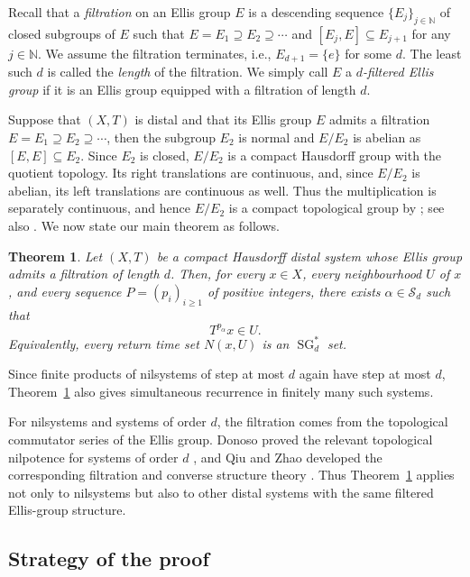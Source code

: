 \documentclass[11pt]{amsart}
\newtheorem{theorem}{Theorem}[section]
\theoremstyle{definition}
\theoremstyle{remark}
\DeclareMathOperator{\SG}{SG}
\newcommand{\Sd}{\mathcal S_d}
\begin{document}
Recall that a \emph{filtration} on an Ellis group $E$ is a descending sequence $\{E_j\}_{j \in \mathbb{N}}$ of closed subgroups of $E$ such that $E = E_1 \supseteq E_2 \supseteq \cdots$ and  $[E_j, E] \subseteq E_{j+1}$ for any $j \in \mathbb{N}$. 
 We assume the filtration terminates, i.e., $E_{d+1} = \{e\}$ for some $d$.
  The least such $d$ is called the \emph{length} of the filtration. We simply call $E$ a \emph{$d$-filtered Ellis group} if it is an Ellis group equipped with a filtration of length $d$.

Suppose that $(X,T)$ is distal and that its Ellis group $E$ admits a filtration $E=E_1 \supseteq E_2 \supseteq \cdots$, then the subgroup $E_2$ is normal and $E/E_2$ is abelian as $[E, E] \subseteq E_2$.  
Since $E_2$ is closed, $E/E_2$ is a compact Hausdorff group with the quotient topology. Its right translations are continuous, and, since $E/E_2$ is abelian, its left translations are continuous as well. Thus the multiplication is separately continuous, and hence $E/E_2$ is a compact topological group by \cite[Corollary~4.3]{QiuZhao2022}; see also \cite[Appendix~B, Corollary~B.18]{de Vries}.
We now state our main theorem as follows.

\begin{theorem}\label{thm:dynamical}
Let $(X,T)$ be a compact Hausdorff distal system whose Ellis group admits a
filtration of length $d$.  Then, for every $x\in X$, every
neighbourhood $U$ of $x$, and every sequence $P=(p_i)_{i\geq1}$ of positive
integers, there exists $\alpha\in\Sd$ such that
\[
 T^{p_\alpha}x\in U.
\]
Equivalently, every return time set $N(x,U)$ is an $\SG_d^*$ set.
\end{theorem}

Since finite products of nilsystems of step at most $d$ again have step at
most $d$, Theorem~\ref{thm:dynamical} also gives simultaneous recurrence in
finitely many such systems.

For nilsystems and systems of order $d$, the filtration comes from the topological commutator series of
the Ellis group.  Donoso proved the relevant topological nilpotence for
systems of order $d$ \cite{Donoso2014}, and Qiu and Zhao developed the
corresponding filtration and converse structure theory \cite{QiuZhao2022}. Thus Theorem~\ref{thm:dynamical} applies not only to nilsystems but also to other distal systems
with the same filtered Ellis-group structure.

\subsection{Strategy of the proof}\label{sec:intro-proof}
\end{document}
